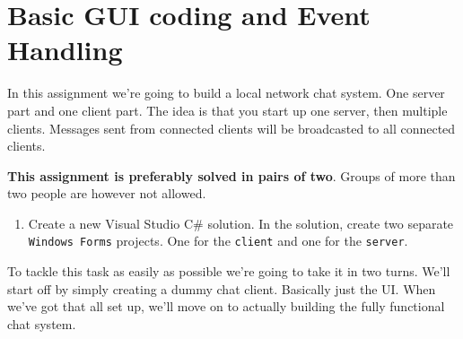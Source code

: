 \documentclass{article}
\newcounter{stepcounter}
\newenvironment{steps}{ 
  \begin{enumerate}[label=\color{red}Step \theenumi)]
    \setcounter{enumi}{\value{stepcounter}}
}{
  \setcounter{stepcounter}{\value{enumi}}
  \end{enumerate}
}
\begin{document}
\pagebreak
\section{Basic GUI coding and Event Handling}
In this assignment we're going to build a local network chat system. One server part and one client part. The idea is that you start up one server, then multiple clients. Messages sent from connected clients will be broadcasted to all connected clients.

\textbf{This assignment is preferably solved in pairs of two}. Groups of more than two people are however not allowed.
\begin{steps}
\item Create a new Visual Studio C\# solution. In the solution, create two separate \texttt{Windows Forms} projects. One for the \texttt{client} and one for the \texttt{server}.
\end{steps}
To tackle this task as easily as possible we're going to take it in two turns. We'll start off by simply creating a dummy chat client. Basically just the UI. When we've got that all set up, we'll move on to actually building the fully functional chat system.
\end{document}
